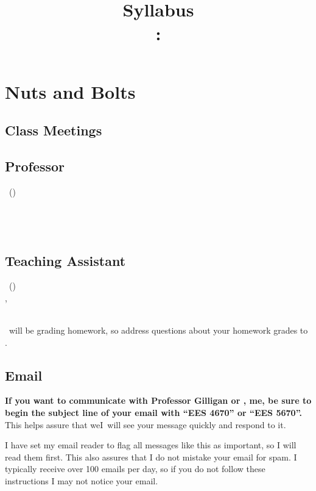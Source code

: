 \documentclass[11pt,twoside]{jgsyllabus}\usepackage[]{graphicx}\usepackage[]{xcolor}
\title{Syllabus\\
\ShortCourseNumber: \LongCourseName}
\begin{document}
\maketitle

\iffalse
\noindent
\textbf{\large \textsc{Note:} This is a draft syllabus, subject to change.}

\fi
\section[Nuts \& Bolts]{Nuts and Bolts}
\label{sec:NutsAndBolts}
\subsection{Class Meetings}
\ClassMeetings
\subsection{Professor}
\label{sec:Professor}
\ProfName\ (\ProfPronouns)\\
\ProfDescr\\
\ProfOffice\\
\ProfEmail\\
\ProfOfficeHours
%
\ifTA
\subsection{Teaching Assistant}
\label{sec:TA}
\TaName\ (\TaPronouns)\\
\TaOfficeLoc\ifTaPhone , \TaPhone\fi\\
\TaEmail\\
\TaOfficeHours
\medskip

\noindent
\TaTitle\ will be grading homework, so address questions about your homework grades
to \TaAccusative.
\fi

\subsection{Email}
\textbf{%
If you want to communicate with
\ifTA
Professor Gilligan or \TaTitle,
\else
me,
\fi
be sure to begin the
subject line of your email with ``{\scshape EES 4670}'' or ``{\scshape EES 5670}''.
}%
This helps assure
that \ifTA we\else I\fi\ will see your message quickly and respond to it.

I have set my email reader to flag all messages like this as important, so I
will read them first. This also assures that I do not mistake your email for
spam. I typically receive over 100 emails per day, so if you do not follow these
instructions I may not notice your email.
\end{document}

